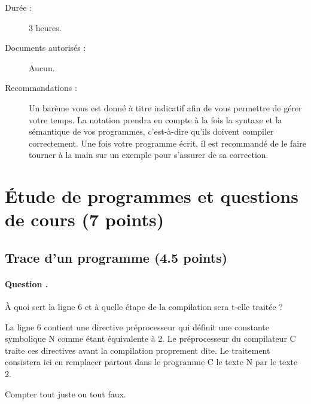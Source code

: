 
\setcounter{questioncount}{0}
\newcommand{\question}{\addtocounter{questioncount}{1}\paragraph{Question \Alph{questioncount}.}}
\newcommand{\commentaire}[1]{}

\vspace{-1cm}
\begin{description}
\item[Durée :] 3 heures.
\item[Documents autorisés :] Aucun.
\item[Recommandations :] Un barème vous est donné à
titre indicatif afin de vous permettre de gérer votre temps. La
notation prendra en compte à la fois la syntaxe et la sémantique de
vos programmes, c'est-à-dire qu'ils doivent compiler correctement. Une
fois votre programme écrit, il est recommandé de le faire tourner à la
main sur un exemple pour s'assurer de sa correction.
\end{description}


\section{Étude de programmes et questions de cours (7 points)}

\subsection{Trace d'un programme (4.5 points)}

\begin{small}
\end{small}

\question 
À quoi sert la ligne 6 et à quelle étape de la compilation sera t-elle traitée ?

\begin{correction}
  La ligne 6 contient une directive préprocesseur qui définit une constante symbolique N comme étant équivalente à 2. Le préprocesseur du compilateur C traite ces directives avant la compilation proprement dite. Le traitement consistera ici en remplacer partout dans le programme C le texte N par le texte 2.
\end{correction}

\begin{baremeenv}
  Compter tout juste ou tout faux.
\end{baremeenv}

